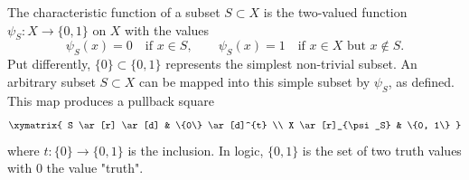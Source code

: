 The characteristic function of a subset $S \subset X$ is the two-valued function $\psi_S \colon X \to \{0, 1\}$ on $X$ with the values
$$
\psi_S(x) = 0 \quad \text{if } x \in S, \qquad \psi_S(x) = 1 \quad \text{if } x \in X \text{ but } x \notin S.
$$
Put differently, $\{0\} \subset \{0, 1\}$ represents the simplest non-trivial subset. An arbitrary subset $S \subset X$ can be mapped into this simple subset by $\psi_S$, as defined. This map produces a pullback square
$$
\xymatrix{
  S \ar[r] \ar[d] & \{0\} \ar[d]^{t} \\
  X \ar[r]_{\psi_S} & \{0, 1\}
}
$$
where $t \colon \{0\} \to \{0, 1\}$ is the inclusion. In logic, $\{0, 1\}$ is the set of two truth values with $0$ the value "truth".
